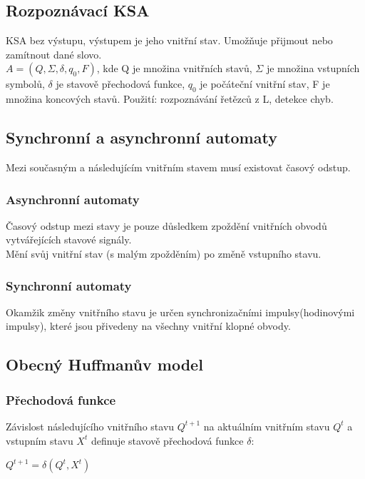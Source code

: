 \subsection{Rozpoznávací KSA}
KSA bez výstupu, výstupem je jeho vnitřní stav. Umožňuje přijmout nebo zamítnout dané slovo. \\
\(A = (Q, \Sigma, \delta, q_0, F) \), kde Q je množina vnitřních stavů, \(\Sigma \) je množina vstupních symbolů, \(\delta \) je stavově přechodová funkce, \(q_0\) je počáteční vnitřní stav, F je množina koncových stavů.
Použití: rozpoznávání řetězců z L, detekce chyb.\\

\subsection{Synchronní a asynchronní automaty}
Mezi současným a následujícím vnitřním stavem musí existovat časový odstup.\\
\subsubsection{Asynchronní automaty}
Časový odstup mezi stavy je pouze důsledkem zpoždění vnitřních obvodů vytvářejících stavové signály.\\
Mění svůj vnitřní stav (s malým zpožděním) po změně vstupního stavu.\\
\subsubsection{Synchronní automaty}
Okamžik změny vnitřního stavu je určen synchronizačními impulsy(hodinovými impulsy), které jsou přivedeny na všechny vnitřní klopné obvody.\\

\subsection{Obecný Huffmanův model}
\subsubsection{Přechodová funkce}
Závislost následujícího vnitřního stavu \(Q^{t+1}\) na aktuálním vnitřním stavu \(Q^t\) a vstupním stavu \(X^t\) definuje stavově přechodová funkce \(\delta \):
\begin{center}
    \(Q^{t+1} = \delta(Q^t,X^t)\)
\end{center}

